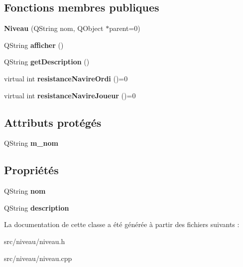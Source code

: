 \subsection*{Fonctions membres publiques}
\begin{DoxyCompactItemize}
\item 
{\bfseries Niveau} (Q\+String nom, Q\+Object $\ast$parent=0)\hypertarget{class_niveau_a3fbdc4ab93573d004984a3eab293f4d9}{}\label{class_niveau_a3fbdc4ab93573d004984a3eab293f4d9}

\item 
Q\+String {\bfseries afficher} ()\hypertarget{class_niveau_a37e55e6e6c312d586b40835edf84605f}{}\label{class_niveau_a37e55e6e6c312d586b40835edf84605f}

\item 
Q\+String {\bfseries get\+Description} ()\hypertarget{class_niveau_a82ee13fe6015b6ede7d19103fd728cb2}{}\label{class_niveau_a82ee13fe6015b6ede7d19103fd728cb2}

\item 
virtual int {\bfseries resistance\+Navire\+Ordi} ()=0\hypertarget{class_niveau_ad4549b64749f16682e411165ac8c6254}{}\label{class_niveau_ad4549b64749f16682e411165ac8c6254}

\item 
virtual int {\bfseries resistance\+Navire\+Joueur} ()=0\hypertarget{class_niveau_ad42a882c81cfc33d157e18c59accd3cd}{}\label{class_niveau_ad42a882c81cfc33d157e18c59accd3cd}

\end{DoxyCompactItemize}
\subsection*{Attributs protégés}
\begin{DoxyCompactItemize}
\item 
Q\+String {\bfseries m\+\_\+nom}\hypertarget{class_niveau_ae502dc8f2dd3487237d804bb1ea573e5}{}\label{class_niveau_ae502dc8f2dd3487237d804bb1ea573e5}

\end{DoxyCompactItemize}
\subsection*{Propriétés}
\begin{DoxyCompactItemize}
\item 
Q\+String {\bfseries nom}\hypertarget{class_niveau_a422f3ce8febcf42174b60740626b9e6d}{}\label{class_niveau_a422f3ce8febcf42174b60740626b9e6d}

\item 
Q\+String {\bfseries description}\hypertarget{class_niveau_ac77687fe407b44fa85da30bbe9efa41e}{}\label{class_niveau_ac77687fe407b44fa85da30bbe9efa41e}

\end{DoxyCompactItemize}


La documentation de cette classe a été générée à partir des fichiers suivants \+:\begin{DoxyCompactItemize}
\item 
src/niveau/niveau.\+h\item 
src/niveau/niveau.\+cpp\end{DoxyCompactItemize}
